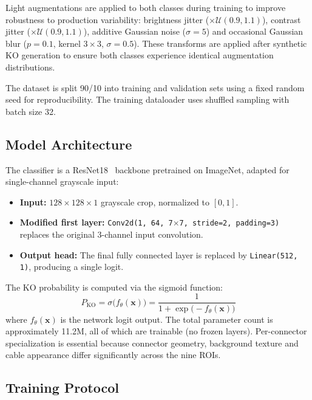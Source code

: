 \documentclass[11pt,a4paper,draft]{article}
\begin{document}
Light augmentations are applied to both classes during training to improve robustness to production variability: brightness jitter ($\times \mathcal{U}(0.9, 1.1)$), contrast jitter ($\times \mathcal{U}(0.9, 1.1)$), additive Gaussian noise ($\sigma=5$) and occasional Gaussian blur ($p=0.1$, kernel $3 \times 3$, $\sigma=0.5$). These transforms are applied after synthetic KO generation to ensure both classes experience identical augmentation distributions.

The dataset is split 90/10 into training and validation sets using a fixed random seed for reproducibility. The training dataloader uses shuffled sampling with batch size 32.

\subsection{Model Architecture}

The classifier is a ResNet18~\cite{he2016resnet} backbone pretrained on ImageNet, adapted for single-channel grayscale input:

\begin{itemize}[nosep]
    \item \textbf{Input:} $128 \times 128 \times 1$ grayscale crop, normalized to $[0, 1]$.
    \item \textbf{Modified first layer:} \texttt{Conv2d(1, 64, 7$\times$7, stride=2, padding=3)} replaces the original 3-channel input convolution.
    \item \textbf{Output head:} The final fully connected layer is replaced by \texttt{Linear(512, 1)}, producing a single logit.
\end{itemize}

The KO probability is computed via the sigmoid function:
\begin{equation}
    P_{\mathrm{KO}} = \sigma\bigl(f_\theta(\mathbf{x})\bigr) = \frac{1}{1 + \exp\bigl(-f_\theta(\mathbf{x})\bigr)}
\end{equation}
where $f_\theta(\mathbf{x})$ is the network logit output. The total parameter count is approximately 11.2M, all of which are trainable (no frozen layers). Per-connector specialization is essential because connector geometry, background texture and cable appearance differ significantly across the nine ROIs.

\subsection{Training Protocol}
\end{document}
